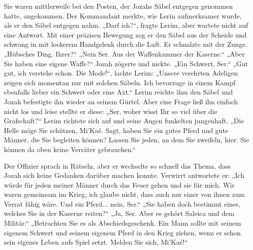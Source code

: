 Sie waren mittlerweile bei den Posten, der Jozahs Säbel entgegen genommen hatte, angekommen. Der 
Kommandant merkte, wie Lerin aufmerksamer wurde, als er den Säbel entgegen nahm.
„Darf ich?“, fragte Lerim, aber wartete nicht auf eine Antwort.
Mit einer präzisen Bewegung zog er den Säbel aus der Scheide und schwang in mit lockerem Handgelenk 
durch die Luft. Er schnalzte mit der Zunge. „Hübsches Ding. Ihrer?“
„Nein Ser. Aus der Waffenkammer der Kaserne.“
„Aber Sie haben eine eigene Waffe?“
Jozah zögerte und nickte. „Ein Schwert, Ser.“
„Gut gut, ich verstehe schon. Die Mode!“, lachte Lerim: „Unsere verehrten Adeligen zeigen sich 
momentan nur mit solchen Säbeln. Ich bevorzuge in einem Kampf ebenfalls lieber ein Schwert oder eine 
Axt.“
Lerim reichte ihm den Säbel und Jozah befestigte ihn wieder an seinem Gürtel. Aber eine Frage ließ 
ihn einfach nicht los und leise stellte er diese: „Ser, woher wisst Ihr so viel über die 
Grafschaft?“
Lerim richtete sich auf und seine Augen funkelten jungenhaft. „Die Helle möge Sie schützen, Mi'Kaé. 
Sagt, haben Sie ein gutes Pferd und gute Männer, die Sie begleiten  können? Lassen Sie jeden, an dem 
Sie zweifeln, hier. Sie können da oben keine Verräter gebrauchen.“

Der Offizier sprach in Rätseln, aber er wechselte so schnell das Thema, dass Jozah sich keine 
Gedanken darüber machen konnte. Verwirrt antwortete er: „Ich würde für jeden meiner Männer durch das 
Feuer gehen und sie für mich. Wir waren gemeinsam im Krieg, ich glaube nicht, dass auch nur einer 
von ihnen zum Verrat fähig wäre. Und ein Pferd... nein, Ser.“
„Sie haben doch bestimmt eines, welches Sie in der Kaserne reiten?“
„Ja, Ser. Aber es gehört Saleica und dem Militär.“
„Betrachten Sie es als Abschiedsgeschenk. Ein Mann sollte mit seinem eigenem Schwert und seinem 
eigenem Pferd in den Krieg ziehen, wenn er schon sein eigenes Leben aufs Spiel setzt. Melden Sie 
sich, Mi'Kaé!“ 
